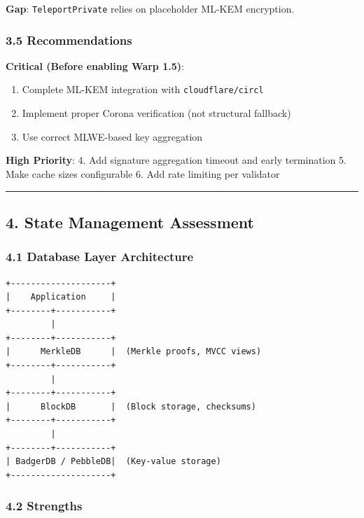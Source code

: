 \documentclass[
]{article}
\providecommand{\tightlist}{%
  \setlength{\itemsep}{0pt}\setlength{\parskip}{0pt}}
\begin{document}
\textbf{Gap}: \texttt{TeleportPrivate} relies on placeholder ML-KEM
encryption.

\subsubsection{3.5 Recommendations}\label{35-recommendations}

\textbf{Critical (Before enabling Warp 1.5)}:

\begin{enumerate}
\def\labelenumi{\arabic{enumi}.}
\tightlist
\item
  Complete ML-KEM integration with \texttt{cloudflare/circl}
\item
  Implement proper Corona verification (not structural fallback)
\item
  Use correct MLWE-based key aggregation
\end{enumerate}

\textbf{High Priority}: 4. Add signature aggregation timeout and early
termination 5. Make cache sizes configurable 6. Add rate limiting per
validator

\begin{center}\rule{0.5\linewidth}{0.5pt}\end{center}

\subsection{4. State Management
Assessment}\label{4-state-management-assessment}

\subsubsection{4.1 Database Layer
Architecture}\label{41-database-layer-architecture}

\begin{verbatim}
+--------------------+
|    Application     |
+--------+-----------+
         |
+--------+-----------+
|      MerkleDB      |  (Merkle proofs, MVCC views)
+--------+-----------+
         |
+--------+-----------+
|      BlockDB       |  (Block storage, checksums)
+--------+-----------+
         |
+--------+-----------+
| BadgerDB / PebbleDB|  (Key-value storage)
+--------------------+
\end{verbatim}

\subsubsection{4.2 Strengths}\label{42-strengths}
\end{document}
